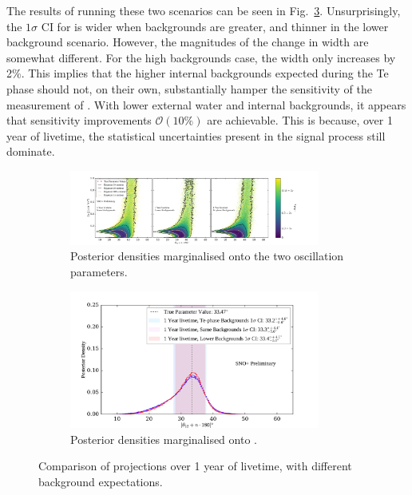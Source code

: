 The results of running these two scenarios can be seen in Fig.~\ref{fig:osc_plots_low_vs_hi_backs}. Unsurprisingly, the $1\sigma$ CI for \tonetwo{} is wider when backgrounds are greater, and thinner in the lower background scenario. However, the magnitudes of the change in width are somewhat different. For the high backgrounds case, the width only increases by 2\%. This implies that the higher internal backgrounds expected during the Te phase should not, on their own, substantially hamper the sensitivity of the measurement of \tonetwo{}. With lower external water and internal  backgrounds, it appears that sensitivity improvements $\mathcal{O}(10\%)$ are achievable. This is because, over 1 year of livetime, the statistical uncertainties present in the signal process still dominate.

\begin{figure}
    \centering
    \begin{subfigure}{0.98\textwidth}
        \centering
        \includegraphics[width=0.9\textwidth]{6_SolarAnalysis/images/steve_style_contours_projections_low_vs_hi_1yr.png}
        \caption{Posterior densities marginalised onto the two oscillation parameters.}
        \label{fig:2D_posteriors_low_vs_hi_backs}
    \end{subfigure}
    \begin{subfigure}{0.98\textwidth}
        \centering
        \includegraphics[width=0.9\textwidth]{6_SolarAnalysis/images/theta_12_comparison_projections_low_vs_Te_backs_1yr.pdf}
        \caption{Posterior densities marginalised onto \tonetwo{}.}
        \label{fig:1D_posteriors_low_vs_hi_backs}
    \end{subfigure}
    \caption{Comparison of projections over 1 year of livetime, with different background expectations.}
    \label{fig:osc_plots_low_vs_hi_backs}
\end{figure}

